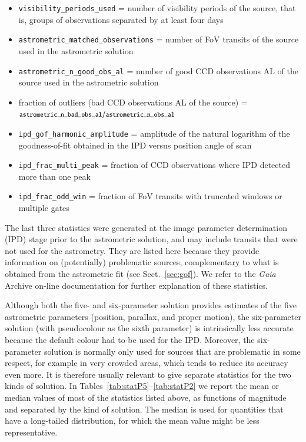 \documentclass[longauth]{aa} %
\newcommand{\gacs}[1]{{\footnotesize\texttt{#1}}}
\begin{document}
\begin{itemize}
\item  \gacs{visibility\_periods\_used} = number of visibility periods of the source,
that is, groups of observations separated by at least four days
\item  \gacs{astrometric\_matched\_observations} = number of FoV
transits of the source used in the astrometric solution
\item \gacs{astrometric\_n\_good\_obs\_al} = number of good
CCD observations AL of the source used in the astrometric solution 
\item fraction of outliers (bad CCD observations AL of the source) = 
$\gacs{astrometric\_n\_bad\_obs\_al}/\gacs{astrometric\_n\_obs\_al}$
\item \gacs{ipd\_gof\_harmonic\_amplitude} = amplitude of the natural logarithm of the
goodness-of-fit obtained in the IPD versus position angle of scan
\item \gacs{ipd\_frac\_multi\_peak} = fraction of CCD observations where IPD detected 
more than one peak
\item \gacs{ipd\_frac\_odd\_win} = fraction of FoV transits with truncated windows 
or multiple gates
\end{itemize}
The last three statistics were generated at the image parameter determination (IPD) stage
prior to the astrometric solution, and may include transits that were not used for the
astrometry. They are listed here because they provide information on (potentially) 
problematic sources, complementary to what is obtained from the astrometric 
fit (see Sect.~\ref{sec:gof}). We refer to the \textit{Gaia} Archive 
on-line documentation for further explanation of these statistics.

Although both the five- and six-parameter solution provides estimates of the five 
astrometric parameters (position, parallax, and proper motion), the six-parameter 
solution (with pseudocolour as the sixth parameter) is intrinsically less accurate 
because the default colour had to be used for the IPD. Moreover, the six-parameter 
solution is normally only used for sources that are problematic in some respect, 
for example in very crowded areas, which tends to reduce its accuracy even more. 
It is therefore usually relevant to give separate statistics for the two kinds of 
solution. In Tables~\ref{tab:statP5}--\ref{tab:statP2} we report the mean or median 
values of most of the statistics listed above, as functions of magnitude and separated 
by the kind of solution. The median is used for quantities that have a long-tailed 
distribution, for which the mean value might be less representative.
\end{document}
